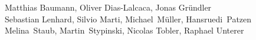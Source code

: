 %
%
%
Matthias Baumann,
Oliver Dias-Lalcaca,
Jonas Gründler%
\\
Sebastian Lenhard,
Silvio Marti,
Michael~Müller,
Hansruedi~Patzen%
\\
Melina~Staub,
Martin~Stypinski,
Nicolas Tobler,
Raphael Unterer
\\
